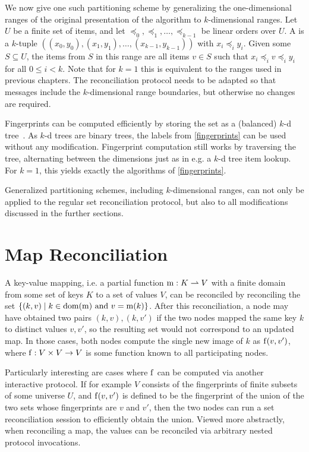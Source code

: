 We now give one such partitioning scheme by generalizing the one-dimensional ranges of the original presentation of the algorithm to $k$-dimensional ranges. Let $U$ be a finite set of items, and let $\preceq_0, \preceq_1, \ldots, \preceq_{k-1}$ be linear orders over $U$. A  is a $k$-tuple $((x_0, y_0), (x_1, y_1), \ldots, (x_{k-1}, y_{k-1}))$ with $x_i \preceq_i y_i$. Given some $S \subseteq U$, the items from $S$ in this range are all items $v \in S$ such that $x_i \preceq_i v \preceq_i y_i$ for all $0 \leq i < k$. Note that for $k = 1$ this is equivalent to the ranges used in previous chapters. The reconciliation protocol needs to be adapted so that messages include the $k$-dimensional range boundaries, but otherwise no changes are required.

Fingerprints can be computed efficiently by storing the set as a (balanced) $k$-d tree~\cite{bentley1975multidimensional}. As $k$-d trees are binary trees, the labels from \cref{fingerprints} can be used without any modification. Fingerprint computation still works by traversing the tree, alternating between the dimensions just as in e.g. a $k$-d tree item lookup. For $k = 1$, this yields exactly the algorithms of \cref{fingerprints}.

Generalized partitioning schemes, including $k$-dimensional ranges, can not only be applied to the regular set reconciliation protocol, but also to all modifications discussed in the further sections.

\section{Map Reconciliation}
\label{maps}

A key-value mapping, i.e. a partial function ${\operatorname{m}}: {K} \rightharpoonup{V}$ with a finite domain from some set of keys $K$ to a set of values $V$, can be reconciled by reconciling the set $\{(k, v) \mid \text{$k \in \operatorname{dom}(\operatorname{m})$ and $v = \operatorname{m}(k)$}\}$. After this reconciliation, a node may have obtained two pairs $(k, v), (k, v')$ if the two nodes mapped the same key $k$ to distinct values $v, v'$, so the resulting set would not correspond to an updated map. In those cases, both nodes compute the single new image of $k$ as $\operatorname{f}(v, v')$, where ${\operatorname{f}}: {V \times V} \rightarrow {V}$ is some function known to all participating nodes.

Particularly interesting are cases where $\operatorname{f}$ can be computed via another interactive protocol. If for example $V$ consists of the fingerprints of finite subsets of some universe $U$, and $\operatorname{f}(v, v')$ is defined to be the fingerprint of the union of the two sets whose fingerprints are $v$ and $v'$, then the two nodes can run a set reconciliation session to efficiently obtain the union. Viewed more abstractly, when reconciling a map, the values can be reconciled via arbitrary nested protocol invocations.

